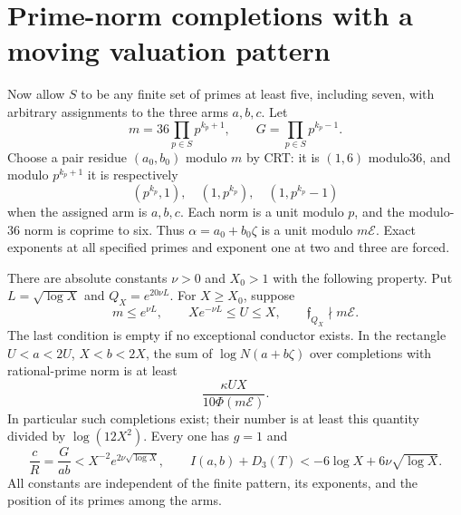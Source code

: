 \section{Prime-norm completions with a moving valuation pattern}
\label{cr:prime-completion}
Now allow $S$ to be any finite set of primes at least five, including seven,
with arbitrary assignments to the three arms $a,b,c$. Let
\[
 m=36\prod_{p\in S}p^{k_p+1},\qquad
 G=\prod_{p\in S}p^{k_p-1}.
\]
Choose a pair residue $(a_0,b_0)$ modulo $m$ by CRT: it is $(1,6)$ modulo36,
and modulo $p^{k_p+1}$ it is respectively
\[
 (p^{k_p},1),\quad (1,p^{k_p}),\quad (1,p^{k_p}-1)
\]
when the assigned arm is $a,b,c$. Each norm is a unit modulo $p$, and the
modulo-36 norm is coprime to six. Thus $\alpha=a_0+b_0\zeta$ is a unit modulo
$m\mathcal E$. Exact exponents at all specified primes and exponent one at
two and three are forced.

\begin{theorem}\label{cr:prime-main}
There are absolute constants $\nu>0$ and $X_0>1$ with the following property.
Put $L=\sqrt{\log X}$ and $Q_X=e^{20\nu L}$. For $X\ge X_0$, suppose
\begin{equation}\label{cr:range}
 m\le e^{\nu L},\qquad Xe^{-\nu L}\le U\le X,
 \qquad \mathfrak f_{Q_X}\nmid m\mathcal E.
\end{equation}
The last condition is empty if no exceptional conductor exists.
In the rectangle $U<a<2U$, $X<b<2X$, the sum of $\log N(a+b\zeta)$ over
completions with rational-prime norm is at least
\begin{equation}\label{cr:weighted-count}
 \frac{\kappa UX}{10\Phi(m\mathcal E)}.
\end{equation}
In particular such completions exist; their number is at least this quantity
divided by $\log(12X^2)$. Every one has $g=1$ and
\begin{equation}\label{cr:prime-corr}
 \frac cR=\frac G{ab}<X^{-2}e^{2\nu\sqrt{\log X}},\qquad
 I(a,b)+D_3(T)<-6\log X+6\nu\sqrt{\log X}.
\end{equation}
All constants are independent of the finite pattern, its exponents, and the
position of its primes among the arms.
\end{theorem}

